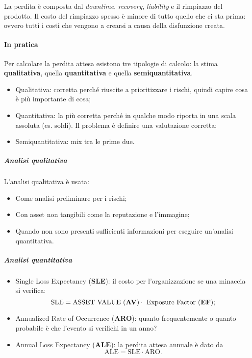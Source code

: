 La perdita è composta dal \textit{downtime}, \textit{recovery},
\textit{liability} e il rimpiazzo del prodotto. Il costo del rimpiazzo spesso è
minore di tutto quello che ci sta prima: ovvero tutti i costi che vengono a
crearsi a causa della disfunzione creata.

\paragraph*{In pratica}

Per calcolare la perdita attesa esistono tre tipologie di calcolo: la stima
\textbf{qualitativa}, quella \textbf{quantitativa} e quella
\textbf{semiquantitativa}.

\begin{itemize}
\item Qualitativa: corretta perché riuscite a prioritizzare i rischi, quindi
capire cosa è più importante di cosa;
\item Quantitativa: la più corretta perché in qualche modo riporta in una scala
assoluta (es. soldi). Il problema è definire una valutazione corretta;
\item Semiquantitativa: mix tra le prime due.
\end{itemize}

\subparagraph*{Analisi qualitativa}

L'analisi qualitativa è usata:
\begin{itemize}
\item Come analisi preliminare per i rischi;
\item Con asset non tangibili come la reputazione e l'immagine;
\item Quando non sono presenti sufficienti informazioni per eseguire 
un'analisi quantitativa.
\end{itemize}

\subparagraph*{Analisi quantitativa}

\begin{itemize}
\item Single Loss Expectancy (\textbf{SLE}): il costo per l'organizzazione se 
una minaccia si verifica:
$$
\text{SLE} = \text{ASSET VALUE (\textbf{AV})} \cdot \text{ Exposure Factor (\textbf{EF})};
$$
\item Annualized Rate of Occurrence (\textbf{ARO}): quanto frequentemente o 
quanto probabile è che l'evento si verifichi in un anno?
\item Annual Loss Expectancy (\textbf{ALE}): la perdita attesa annuale è dato 
da
$$
\text{ALE} = \text{SLE} \cdot \text{ARO}.
$$
\end{itemize}

